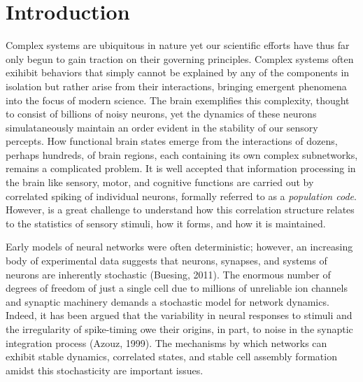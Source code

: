 \documentclass{ucetd}
\begin{document}
\section{Introduction}

Complex systems are ubiquitous in nature yet our scientific efforts have thus far only begun to gain traction on their governing principles. Complex systems often exihibit behaviors that simply cannot be explained by any of the components in isolation but rather arise from their interactions, bringing emergent phenomena into the focus of modern science. The brain exemplifies this complexity, thought to consist of billions of noisy neurons, yet the dynamics of these neurons simulataneously maintain an order evident in the stability of our sensory percepts. How functional brain states emerge from the interactions of dozens, perhaps hundreds, of brain regions, each containing its own complex subnetworks, remains a complicated problem. It is well accepted that information processing in the brain like sensory, motor, and cognitive functions are carried out by correlated spiking of individual neurons, formally referred to as a \emph{population code}. However, is a great challenge to understand how this correlation structure relates to the statistics of sensory stimuli, how it forms, and how it is maintained. 

Early models of neural networks were often deterministic; however, an increasing body of experimental data suggests that neurons, synapses, and systems of neurons are inherently stochastic (Buesing, 2011). The enormous number of degrees of freedom of just a single cell due to millions of unreliable ion channels and synaptic machinery demands a stochastic model for network dynamics. Indeed, it has been argued that the variability in neural responses to stimuli and the irregularity of spike-timing owe their origins, in part, to noise in the synaptic integration process (Azouz, 1999). The mechanisms by which networks can exhibit stable dynamics, correlated states, and stable cell assembly formation amidst this stochasticity are important issues. 
\end{document}
